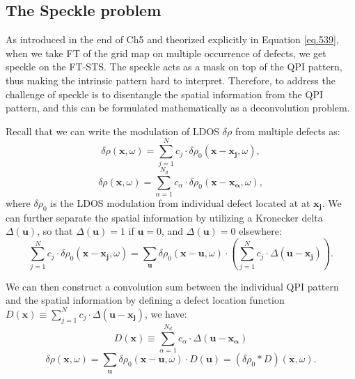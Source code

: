 \subsection{The Speckle problem}
As introduced in the end of Ch5 and theorized explicitly in Equation \ref{eq.539}, when we take \ac{FT} of the grid map on multiple occurrence of defects, we get speckle on the \ac{FT-STS}. The speckle acts as a mask on top of the QPI pattern, thus making the intrinsic pattern hard to interpret. Therefore, to address the challenge of speckle is to disentangle the spatial information from the \ac{QPI} pattern, and this can be formulated mathematically as a deconvolution problem. 

\par \noindent Recall that we can write the modulation of \ac{LDOS} $\delta \rho$ from multiple defects as:
\begin{equation}
	\delta \rho(\mathbf{x}, \omega) = \sum_{j=1}^{N}c_j \cdot \delta \rho_0(\mathbf{x}-\mathbf{x_j},\omega),
\end{equation}
\begin{equation}
	\delta \rho(\mathbf{x}, \omega) = \sum_{\alpha=1}^{N_d}c_{\alpha} \cdot \delta \rho_0(\mathbf{x}-\mathbf{x_{\alpha}},\omega),
\end{equation}
\noindent where $\delta \rho_0$ is the \ac{LDOS} modulation from individual defect located at at $\mathbf{x_j}$. We can further separate the spatial information by utilizing a Kronecker delta $\Delta(\mathbf{u})$, so that $\Delta(\mathbf{u})=1$ if $\mathbf{u} = 0$, and $\Delta(\mathbf{u})=0$ elsewhere: 
\begin{equation}
	\sum_{j=1}^{N}c_j \cdot \delta \rho_0(\mathbf{x}-\mathbf{x_j},\omega) = \sum_{\mathbf{u}} \delta \rho_0(\mathbf{x}-\mathbf{u},\omega)\cdot(\sum_{j=1}^{N} c_j \cdot \Delta(\mathbf{u-x_j})).
\end{equation}


\noindent We can then construct a convolution sum between the individual \ac{QPI} pattern and the spatial information by defining a defect location function $D(\mathbf{x}) \equiv \sum_{j=1}^{N} c_j \cdot \Delta(\mathbf{u-x_j})$, we have: 
\begin{equation}
	D(\mathbf{x}) \equiv \sum_{\alpha=1}^{N_d} c_{\alpha} \cdot \Delta(\mathbf{u-x_{\alpha}})
\end{equation}
\begin{equation}
	\delta \rho(\mathbf{x}, \omega) =  \sum_{\mathbf{u}} \delta \rho_0(\mathbf{x}-\mathbf{u},\omega)\cdot D(\mathbf{u}) = (\delta \rho_0 *D)(\mathbf{x}, \omega).
\end{equation}


